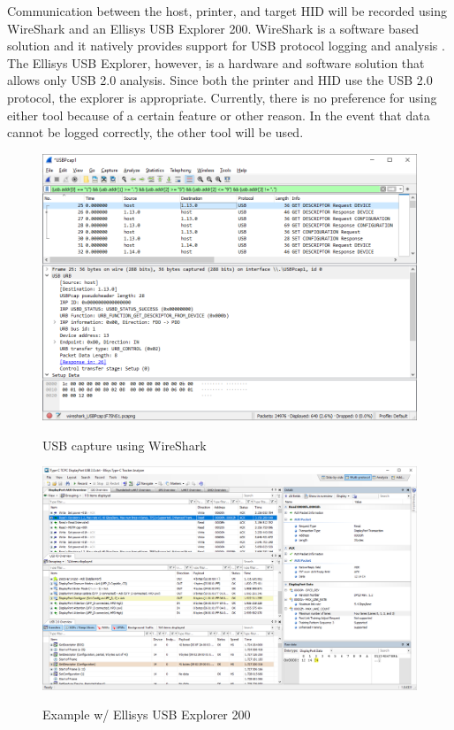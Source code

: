 Communication between the host, printer, and target HID will be recorded using WireShark and an Ellisys USB Explorer 200. WireShark is a software based solution and it natively provides support for USB protocol logging and analysis \autocite{CaptureSetupUSBWireshark}. The Ellisys USB Explorer, however, is a hardware and software solution that allows only USB 2.0 analysis. Since both the printer and HID use the USB 2.0 protocol, the explorer is appropriate. Currently, there is no preference for using either tool because of a certain feature or other reason. In the event that data cannot be logged correctly, the other tool will be used.


\begin{figure}[!htb]%
    \centering
    {\includegraphics[width=148mm,scale=0.8]{Figures/wireshark_capture.png}}
    \caption{USB capture using WireShark}%
    \label{fig:wireshark_usb}%
\end{figure}

\begin{figure}[!htb]%
    \centering
    {\includegraphics[width=148mm,scale=0.8]{Figures/ellisys_explorer.png}}
    \caption{Example w/ Ellisys USB Explorer 200}%
    \label{fig:ellisys_usb}%
\end{figure}

